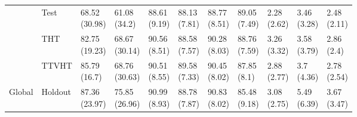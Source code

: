 \begin{table}
\begin{tabular}{lllllllllll}
       & Test &  \makecell{68.52\\(30.98)} &   \makecell{61.08\\(34.2)} &   \makecell{88.61\\(9.19)} &  \makecell{88.13\\(7.81)} &  \makecell{88.77\\(8.51)} &  \makecell{89.05\\(7.49)} &      \makecell{2.28\\(2.62)} &  \makecell{3.46\\(3.28)} &  \makecell{2.48\\(2.11)} \\
       & THT &  \makecell{82.75\\(19.23)} &  \makecell{68.67\\(30.14)} &   \makecell{90.56\\(8.51)} &  \makecell{88.58\\(7.57)} &  \makecell{90.28\\(8.03)} &  \makecell{88.76\\(7.59)} &      \makecell{3.26\\(3.32)} &  \makecell{3.58\\(3.79)} &   \makecell{2.86\\(2.4)} \\
       & TTVHT &   \makecell{85.79\\(16.7)} &  \makecell{68.76\\(30.63)} &   \makecell{90.51\\(8.55)} &  \makecell{89.58\\(7.33)} &  \makecell{90.45\\(8.02)} &   \makecell{87.85\\(8.1)} &      \makecell{2.88\\(2.77)} &   \makecell{3.7\\(4.36)} &  \makecell{2.78\\(2.54)} \\
Global & Holdout &  \makecell{87.36\\(23.97)} &  \makecell{75.85\\(26.96)} &   \makecell{90.99\\(8.93)} &  \makecell{88.78\\(7.87)} &  \makecell{90.83\\(8.02)} &  \makecell{85.48\\(9.18)} &      \makecell{3.08\\(2.75)} &  \makecell{5.49\\(6.39)} &  \makecell{3.67\\(3.47)} \\

\end{tabular}
\end{table}
